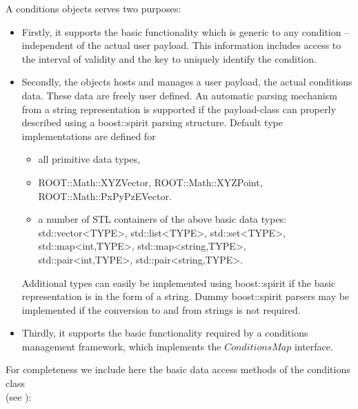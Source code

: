 \documentclass[10pt,a4paper]{article}
\begin{document}
\noindent
A conditions objects serves two purposes:
\begin{itemize}\itemcompact
\item Firstly, it supports the basic functionality which is generic to any 
      condition -- independent of the actual user payload. This information 
      includes access to the interval of validity and the key to uniquely identify
      the condition. 

\item Secondly, the objects hosts and manages a user payload, the actual
      conditions data. These data are freely user defined. An automatic 
      parsing mechanism from a string representation is supported if the 
      payload-class can properly described using a boost::spirit
      parsing structure. Default type implementations are defined for 
      \begin{itemize}\itemcompact
        \item all primitive data types, 
        \item ROOT::Math::XYZVector, ROOT::Math::XYZPoint, ROOT::Math::PxPyPzEVector.
        \item a number of STL containers of the above basic data types:\\
                std::vector\textless TYPE\textgreater, 
                std::list\textless TYPE\textgreater,
                std::set\textless TYPE\textgreater,\\
                std::map\textless int,TYPE\textgreater,
                std::map\textless string,TYPE\textgreater,\\
                std::pair\textless int,TYPE\textgreater,
                std::pair\textless string,TYPE\textgreater.
      \end{itemize}
      Additional types can easily be implemented using boost::spirit if the basic
      representation is in the form of a string. Dummy boost::spirit parsers 
      may be implemented if the conversion to and from strings is not required.
\item Thirdly, it supports the basic functionality required by a 
      conditions management framework, which implements the $ConditionsMap$ 
      interface.
\end{itemize}
For completeness we include here the basic data access methods of the conditions
class\\
(see ):
\end{document}
